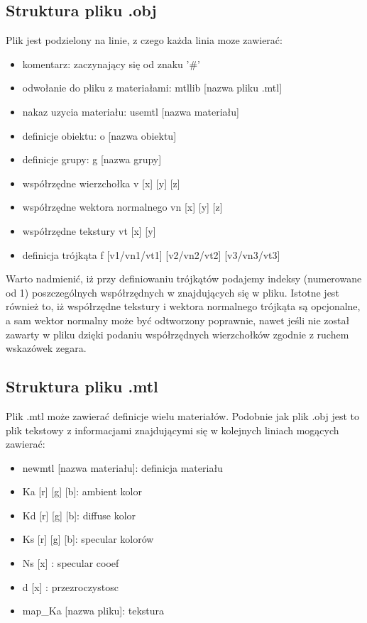 \subsection{Struktura pliku .obj}
Plik jest podzielony na linie, z czego każda linia moze zawierać:
\begin{itemize}
\item komentarz: zaczynający się od znaku '\#'
\item odwołanie do pliku z materiałami: mtllib [nazwa pliku .mtl]
\item nakaz uzycia materiału: usemtl [nazwa materiału]
\item definicje obiektu: o [nazwa obiektu]
\item definicje grupy: g [nazwa grupy]
\item współrzędne wierzchołka v [x] [y] [z]
\item współrzędne wektora normalnego vn [x] [y] [z]
\item współrzędne tekstury vt [x] [y]
\item definicja trójkąta f [v1/vn1/vt1] [v2/vn2/vt2] [v3/vn3/vt3]
\end{itemize}
Warto nadmienić, iż przy definiowaniu trójkątów podajemy indeksy (numerowane od 1) poszczególnych współrzędnych w znajdujących się w pliku.
Istotne jest również to, iż współrzędne tekstury i wektora normalnego trójkąta są opcjonalne, a sam wektor normalny może być odtworzony poprawnie,
nawet jeśli nie został zawarty w pliku dzięki podaniu współrzędnych wierzchołków zgodnie z ruchem wskazówek zegara.


\subsection{Struktura pliku .mtl}
Plik .mtl może zawierać definicje wielu materiałów. Podobnie jak plik .obj jest to plik tekstowy z informacjami znajdującymi
się w kolejnych liniach mogących zawierać:
\begin{itemize}
\item newmtl [nazwa materiału]: definicja materiału
\item Ka [r] [g] [b]: ambient kolor
\item Kd [r] [g] [b]: diffuse kolor
\item Ks [r] [g] [b]: specular kolorów
\item Ns [x]        : specular cooef
\item d  [x]        : przezroczystosc
\item map\_Ka [nazwa pliku]: tekstura 
\end{itemize}


